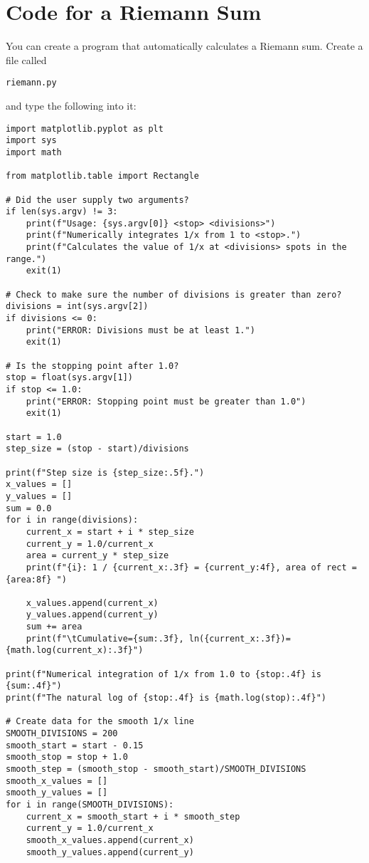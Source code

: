 \section{Code for a Riemann Sum}
You can create a program that automatically calculates a Riemann sum. Create a file called 
\begin{Verbatim}
riemann.py
\end{Verbatim} 
and type the following into it:

\begin{Verbatim}
import matplotlib.pyplot as plt
import sys
import math

from matplotlib.table import Rectangle

# Did the user supply two arguments?
if len(sys.argv) != 3:
    print(f"Usage: {sys.argv[0]} <stop> <divisions>")
    print(f"Numerically integrates 1/x from 1 to <stop>.")
    print(f"Calculates the value of 1/x at <divisions> spots in the range.")
    exit(1)

# Check to make sure the number of divisions is greater than zero?
divisions = int(sys.argv[2])
if divisions <= 0:
    print("ERROR: Divisions must be at least 1.")
    exit(1)

# Is the stopping point after 1.0?
stop = float(sys.argv[1])
if stop <= 1.0:
    print("ERROR: Stopping point must be greater than 1.0")
    exit(1)

start = 1.0
step_size = (stop - start)/divisions

print(f"Step size is {step_size:.5f}.")
x_values = []
y_values = []
sum = 0.0
for i in range(divisions):
    current_x = start + i * step_size
    current_y = 1.0/current_x
    area = current_y * step_size
    print(f"{i}: 1 / {current_x:.3f} = {current_y:4f}, area of rect = {area:8f} ")

    x_values.append(current_x)
    y_values.append(current_y)
    sum += area
    print(f"\tCumulative={sum:.3f}, ln({current_x:.3f})={math.log(current_x):.3f}")

print(f"Numerical integration of 1/x from 1.0 to {stop:.4f} is {sum:.4f}")
print(f"The natural log of {stop:.4f} is {math.log(stop):.4f}")

# Create data for the smooth 1/x line
SMOOTH_DIVISIONS = 200
smooth_start = start - 0.15
smooth_stop = stop + 1.0
smooth_step = (smooth_stop - smooth_start)/SMOOTH_DIVISIONS
smooth_x_values = []
smooth_y_values = []
for i in range(SMOOTH_DIVISIONS):
    current_x = smooth_start + i * smooth_step
    current_y = 1.0/current_x
    smooth_x_values.append(current_x)
    smooth_y_values.append(current_y)


\end{Verbatim}
